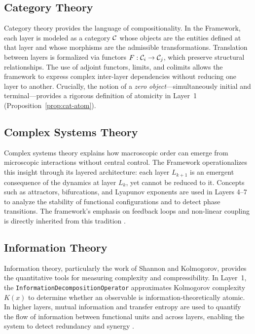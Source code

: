 \subsection{Category Theory}
Category theory provides the language of compositionality. In the \Apeiron{} Framework, each layer is modeled as a category $\mathcal{C}$ whose objects are the entities defined at that layer and whose morphisms are the admissible transformations. Translation between layers is formalized via functors $F: \mathcal{C}_i \to \mathcal{C}_j$, which preserve structural relationships. The use of adjoint functors, limits, and colimits allows the framework to express complex inter-layer dependencies without reducing one layer to another. Crucially, the notion of a \textit{zero object}---simultaneously initial and terminal---provides a rigorous definition of atomicity in Layer~1 (Proposition~\ref{prop:cat-atom}).

\subsection{Complex Systems Theory}
Complex systems theory explains how macroscopic order can emerge from microscopic interactions without central control. The \Apeiron{} Framework operationalizes this insight through its layered architecture: each layer $L_{k+1}$ is an emergent consequence of the dynamics at layer $L_k$, yet cannot be reduced to it. Concepts such as attractors, bifurcations, and Lyapunov exponents are used in Layers 4--7 to analyze the stability of functional configurations and to detect phase transitions. The framework's emphasis on feedback loops and non-linear coupling is directly inherited from this tradition \cite{holland1995, mitchell2009}.

\subsection{Information Theory}
Information theory, particularly the work of Shannon and Kolmogorov, provides the quantitative tools for measuring complexity and compressibility. In Layer~1, the \texttt{InformationDecompositionOperator} approximates Kolmogorov complexity $K(x)$ to determine whether an observable is information-theoretically atomic. In higher layers, mutual information and transfer entropy are used to quantify the flow of information between functional units and across layers, enabling the system to detect redundancy and synergy \cite{shannon1948, li2008}.


